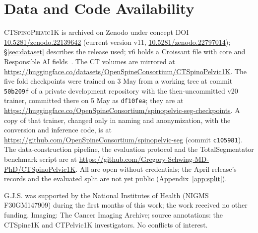\documentclass{article}
\newcommand{\dataset}{\textsc{CTSpinoPelvic1K}}
\newcommand{\TS}{TotalSegmentator}
\begin{document}
\section*{Data and Code Availability}

\dataset{} is archived on Zenodo under concept DOI
\href{https://doi.org/10.5281/zenodo.22139642}{10.5281/zenodo.22139642}
(current version v11,
\href{https://doi.org/10.5281/zenodo.22797014}{10.5281/zenodo.22797014});
\S\ref{sec:dataset} describes the release used; v6 holds
a Croissant file with core and Responsible AI
fields~\citep{Akhtar2024Croissant:Datasets}. The CT
volumes are mirrored at
\url{https://huggingface.co/datasets/OpenSpineConsortium/CTSpinoPelvic1K}.
The five fold checkpoints were trained on 3 May from a
working tree at commit \texttt{50b209f} of a private
development repository with the then-uncommitted v20
trainer, committed there on 5 May as \texttt{df10fea};
they are at
\url{https://huggingface.co/OpenSpineConsortium/spinopelvic-seg-checkpoints}.
A copy of that trainer, changed only
in naming and anonymization, with the conversion and
inference code, is at
\url{https://github.com/OpenSpineConsortium/spinopelvic-seg}
(commit \texttt{c105981}). The data-construction pipeline,
the evaluation protocol and the \TS{} benchmark script are at
\url{https://github.com/Gregory-Schwing-MD-PhD/CTSpinoPelvic1K}.
All are open without credentials; the April release's
records and the evaluated split are not yet public
(Appendix~\ref{app:split}).

\begin{ack}
G.J.S. was supported by the National Institutes of Health
(NIGMS F30GM147909) during the first months of this work;
the work received no other funding. Imaging: The Cancer
Imaging Archive; source annotations: the CTSpine1K and
CTPelvic1K investigators. No conflicts of interest.
\end{ack}




\clearpage
\appendix


\clearpage %

\end{document}
